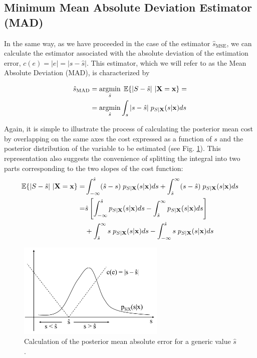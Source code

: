 \subsection{Minimum Mean Absolute Deviation Estimator (MAD)}

In the same way, as we have proceeded in the case of the estimator $\hat s_\text{MSE}$, we can calculate the estimator associated with the absolute deviation of the estimation error, $c(e) = |e| = |s - \hat s|$. This estimator, which we will refer to as the Mean Absolute Deviation (MAD), is characterized by

\begin{align}
\label{ec:coste_MAD}
\hat{s}_\text{MAD} & = \operatorname*{argmin}_{\hat s}\; \mathbb{E}\{|S - \hat s|~|{\bf X} = {\bf x} \} = \\
	  & = \operatorname*{argmin}_{\hat s}   \int_s |s - \hat s|\;p_{S|{\bf X}}(s|{\bf x}) ds
\end{align}

Again, it is simple to illustrate the process of calculating the posterior mean cost by overlapping on the same axes the cost expressed as a function of $s$ and the posterior distribution of the variable to be estimated (see Fig. \ref{fig:estimador_absoluto}). This representation also suggests the convenience of splitting the integral into two parts corresponding to the two slopes of the cost function:
\begin{align}
\mathbb{E}\{|S - \hat s|~|{\bf X} = {\bf x} \} 
	=& \int_{-\infty}^{\hat s} (\hat s - s) \;p_{S|{\bf X}}(s|{\bf x}) ds
		+ \int_{\hat s}^\infty (s - \hat s) \;p_{S|{\bf X}}(s|{\bf x}) ds \\
	=& \hat s \left[  \int_{-\infty}^{\hat s} p_{S|{\bf X}}(s|{\bf x}) ds 
				    - \int_{\hat s}^{\infty}  p_{S|{\bf X}}(s|{\bf x}) ds \right] \\
	 &  + \int_{\hat s}^{\infty}  s \; p_{S|{\bf X}}(s|{\bf x}) ds 
		- \int_{-\infty}^{\hat s} s \; p_{S|{\bf X}}(s|{\bf x}) ds
\end{align}

\begin{figure}[t]
  \begin{center}
  \includegraphics[width=7cm]{Figures//estimador_absoluto.png}
    \caption{Calculation of the posterior mean absolute error for a generic value $\hat s$.}
    \label{fig:estimador_absoluto}
  \end{center}
\end{figure}

